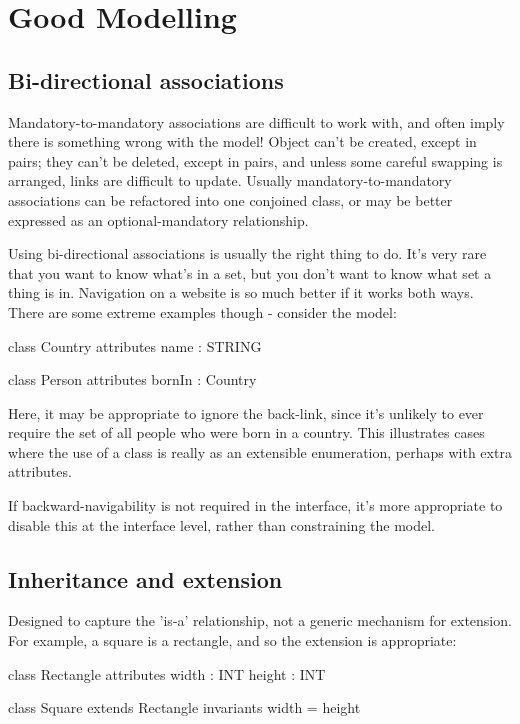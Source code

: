 \chapter{Good Modelling}

\section{Bi-directional associations}

Mandatory-to-mandatory associations are difficult to work with, and
often imply there is something wrong with the model!
Object can't be created, except in pairs; they can't be deleted, except
in pairs, and unless some careful swapping is arranged, links are
difficult to update.  Usually mandatory-to-mandatory associations can
be refactored into one conjoined class, or may be better expressed as
an optional-mandatory relationship.

Using bi-directional associations is usually the right thing to do.
It's very rare that you want to know what's in a set, but you don't
want to know what set a thing is in.  Navigation on a website is so
much better if it works both ways.  There are some extreme examples
though - consider the model:

\begin{code}
class Country {
  attributes
    name : STRING
}

class Person {
  attributes
    bornIn : Country
}
\end{code}

Here, it may be appropriate to ignore the back-link, since it's
unlikely to ever require the set of all people who were born in a
country.  This illustrates cases where the use of a class is really as
an extensible enumeration, perhaps with extra attributes.

If backward-navigability is not required in the interface, it's more
appropriate to disable this at the interface level, rather than
constraining the model.


\section{Inheritance and extension}

Designed to capture the 'is-a' relationship, not a generic mechanism
for extension.  For example, a square is a rectangle, and so the
extension is appropriate:

\begin{code}
class Rectangle {
  attributes
    width : INT
    height : INT
}

class Square extends Rectangle {
  invariants
    width = height
}
\end{code}

